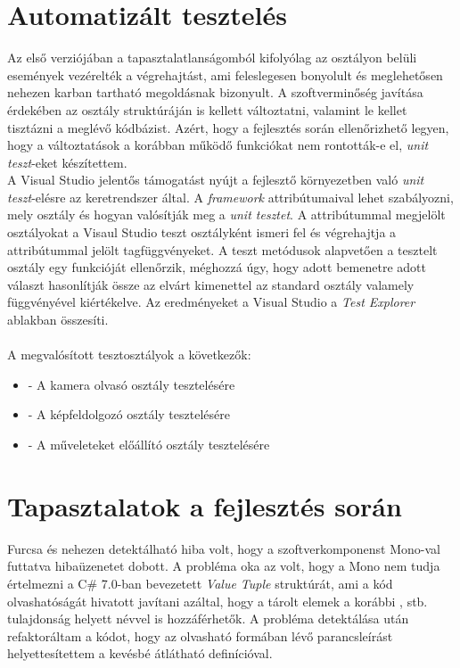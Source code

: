 \section{Automatizált tesztelés}

Az  első verziójában a tapasztalatlanságomból kifolyólag az osztályon belüli események vezérelték a végrehajtást, ami feleslegesen bonyolult és meglehetősen nehezen karban tartható megoldásnak bizonyult. A szoftverminőség javítása érdekében az osztály struktúráján is kellett változtatni, valamint le kellet tisztázni a meglévő kódbázist. Azért, hogy a fejlesztés során ellenőrizhető legyen, hogy a változtatások a korábban működő funkciókat nem rontották-e el, \emph{unit teszt}-eket készítettem.\\
A Visual Studio jelentős támogatást nyújt a fejlesztő környezetben való \emph{unit teszt}-elésre az  keretrendszer által. A \emph{framework} attribútumaival lehet szabályozni, mely osztály és hogyan valósítják meg a \emph{unit tesztet}. A \code{[TestClass]} attribútummal megjelölt osztályokat a Visaul Studio teszt osztályként ismeri fel és végrehajtja a \code{[TestMethod]} attribútummal jelölt tagfüggvényeket. A teszt metódusok alapvetően a tesztelt osztály egy funkcióját ellenőrzik, méghozzá úgy, hogy adott bemenetre adott választ hasonlítják össze az elvárt kimenettel az  standard osztály valamely függvényével kiértékelve. Az eredményeket a Visual Studio a \emph{Test Explorer} ablakban összesíti.\\
\\
A megvalósított tesztosztályok a következők:
\begin{itemize}
\item {} - A kamera olvasó osztály tesztelésére
\item  {} - A képfeldolgozó osztály tesztelésére
\item  {} - A műveleteket előállító osztály tesztelésére
\end{itemize}


\section{Tapasztalatok a fejlesztés során}

Furcsa és nehezen detektálható hiba volt, hogy a szoftverkomponenst Mono-val futtatva  hibaüzenetet dobott. A probléma oka az volt, hogy a Mono nem tudja értelmezni a C\# 7.0-ban bevezetett \textit{Value Tuple} struktúrát, ami a kód olvashatóságát hivatott javítani azáltal, hogy a tárolt elemek a korábbi ,  stb. tulajdonság helyett névvel is hozzáférhetők. A probléma detektálása után refaktoráltam a kódot, hogy az olvasható  formában lévő parancsleírást helyettesítettem a kevésbé átlátható  definícióval. \\